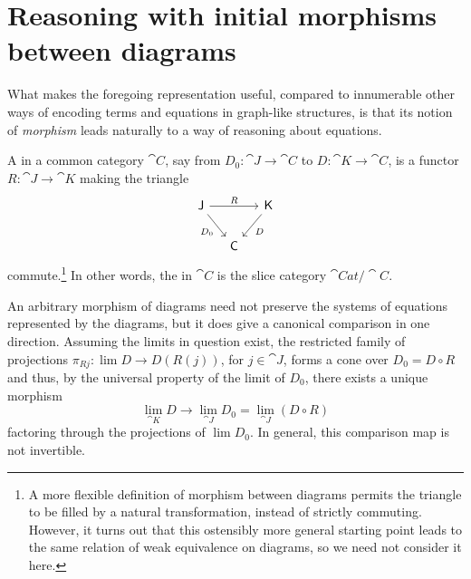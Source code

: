 \documentclass[11pt]{article}
\numberwithin{equation}{section}
\begin{document}
\section{Reasoning with initial morphisms between diagrams}
\label{sec:reasoning}

What makes the foregoing representation useful, compared to innumerable other
ways of encoding terms and equations in graph-like structures, is that its
notion of \emph{morphism} leads naturally to a way of reasoning about equations.

A  in a common category $\cat{C}$, say from
$D_0: \cat{J} \to \cat{C}$ to $D: \cat{K} \to \cat{C}$, is a functor
$R: \cat{J} \to \cat{K}$ making the triangle
\begin{equation*}
  \begin{tikzcd}[column sep=small]
    {\cat{J}} && {\cat{K}} \\
    & {\cat{C}}
    \arrow["R", from=1-1, to=1-3]
    \arrow["{D_0}"', from=1-1, to=2-2]
    \arrow["D", from=1-3, to=2-2]
  \end{tikzcd}
\end{equation*}
commute.\footnote{A more flexible definition of morphism between diagrams
  permits the triangle to be filled by a natural transformation, instead of
  strictly commuting. However, it turns out \cite{carlson2024} that this
  ostensibly more general starting point leads to the same relation of weak
  equivalence on diagrams, so we need not consider it here.} In other words, the
 in $\cat{C}$ is the slice category
$\cat{Cat}/\cat{C}$.

An arbitrary morphism of diagrams need not preserve the systems of equations
represented by the diagrams, but it does give a canonical comparison in one
direction. Assuming the limits in question exist, the restricted family of
projections $\pi_{Rj}: \lim D \to D(R(j))$, for $j \in \cat{J}$, forms a cone over
$D_0 = D \circ R$ and thus, by the universal property of the limit of $D_0$, there
exists a unique morphism
\begin{equation} \label{eq:limit-comparison}
  \textstyle
  \lim_{\cat{K}} D \to \lim_{\cat{J}} D_0 = \lim_{\cat{J}} (D \circ R)
\end{equation}
factoring through the projections of $\lim D_0$. In general, this comparison map
is not invertible.
\end{document}
